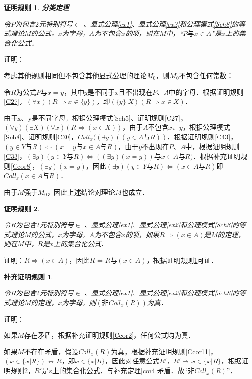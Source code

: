 \documentclass[12pt, a4paper, oneside]{book}
\newtheorem{C}{证明规则}
\newtheorem{Ccor}{补充证明规则}
\begin{document}
			\begin{C}\label{C51}
				\textbf{分类定理}
				\par
				令$P$为包含$2$元特别符号$\in$ 、显式公理\ref{ex1}、显式公理\ref{ex2}和公理模式\ref{Sch8}的等式理论$M$的公式，$x$为字母，$A$为不包含$x$的项，则在$M$中，“$P\text{与}x\in A$”是$x$上的集合化公式．
			\end{C}
			证明：
			\par
			考虑其他规则相同但不包含其他显式公理的理论$M_0$，则$M_0$不包含任何常数：
			\par
			令$R$为公式$P\text{与}x=y$，其中$y$是不同于$x$且不出现在$P$、$A$中的字母．根据证明规则\ref{C27}，$(\forall x)(R\Rightarrow x\in \{y\})$，即$(\{y\}|X) (R\Rightarrow x\in X)$．
			\par
			由于x、y是不同字母，根据公理模式\ref{Sch5}、证明规则\ref{C27}，$(\forall y)(\exists X)(\forall x)(R\Rightarrow (x\in X))$，由于$A$不包含$x$、$y$，根据公理模式\ref{Sch8}、证明规则\ref{C30}，$Coll_x((\exists y)((y\in A\text{与}R))$．根据证明规则\ref{C43}，$(y\in Y\text{与}R)\Leftrightarrow (x=y\text{与}x\in A\text{与}R)$，由于$y$不出现在$P$、$A$中，根据证明规则\ref{C33}，$(\exists y)(y\in Y\text{与}R)\Leftrightarrow ((\exists y)(x=y))\text{与}x\in A\text{与}R)$．根据补充证明规则\ref{Ccor8}，$(\exists y)(x=y)$，因此$(\exists y)(y\in Y\text{与}R)\Leftrightarrow (x\in A\text{与}R)$即$Coll_x(x\in A\text{与}R)$．
			\par
			由于$M$强于$M_0$，因此上述结论对理论$M$也成立．

			\begin{C}\label{C52}
				\hfill\par
				令$R$为包含$2$元特别符号$\in$ 、显式公理\ref{ex1}、显式公理\ref{ex2}和公理模式\ref{Sch8}的等式理论$M$的公式，$x$为字母，$A$为不包含$x$的项，如果$R\Rightarrow (x\in A)$是$M$的定理，则在$M$中，$R$是$x$上的集合化公式．				
			\end{C}
			证明：$R\Rightarrow (x\in A)$，因此$R\Leftrightarrow R\text{与}(x\in A)$，根据证明规则\ref{C51}可证．

			\begin{Ccor}\label{Ccor13}
				\hfill\par
				令$R$为包含$2$元特别符号$\in$ 、显式公理\ref{ex1}、显式公理\ref{ex2}和公理模式\ref{Sch8}的等式理论$M$的定理，$x$为字母，则$(\text{非}Coll_x(R))$为真．				
			\end{Ccor}
			证明：
			\par
			如果$M$存在矛盾，根据补充证明规则\ref{Ccor2}，任何公式均为真．
			\par
			如果$M$不存在矛盾，假设$Coll_x(R)$为真，根据补充证明规则\ref{Ccor11}，$(x\in \{x|R\})\Leftrightarrow R$，即$x\in \{x|R\}$，因此对任意公式$R'$，$R'\Rightarrow x\in \{x|R\}$，根据证明规则\ref{C52}，$R'$是$x$上的集合化公式．与补充定理\ref{cor4}矛盾．故“$\text{非}Coll_x(R)$”．
\end{document}
